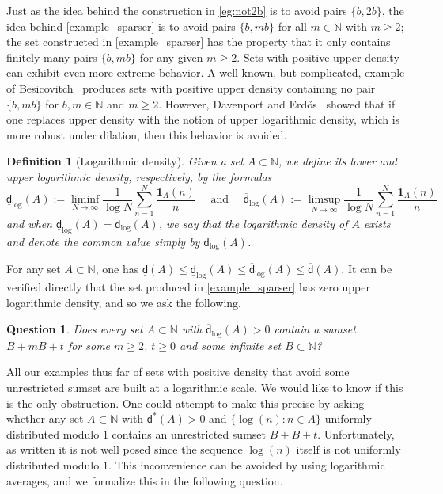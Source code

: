 \documentclass[10pt,dvipsnames]{article}
\newtheorem{definition}[theorem]{Definition}
\newtheorem{question}[theorem]{Question}
\theoremstyle{definition}
\theoremstyle{plain}
\newcommand{\N}{\mathbb{N}}
\newcommand{\dens}{\mathsf{d}}
\newcommand{\udens}{\overline{\mathsf{d}}}
\newcommand{\ldens}{\underline{\mathsf{d}}}
\newcommand{\ubdens}{\mathsf{d}^*}
\newcommand{\Erdos}{Erd\H{o}s}
\newcommand{\one}{\boldsymbol{1}}
\begin{document}
Just as the idea behind the construction in \cref{eg:not2b} is to avoid pairs $\{b,2b\}$, the idea behind \cref{example_sparser} is to avoid pairs $\{b,mb\}$ for all $m \in \N$ with $m\geq2$;
the set constructed in \cref{example_sparser} has the property that it only contains finitely many pairs $\{b,mb\}$ for any given $m\geq 2$.
Sets with positive upper density can exhibit even more extreme behavior. A well-known, but complicated, example of Besicovitch~\cite{Besicovitch35} produces sets with positive upper density containing no pair $\{b,mb\}$ for $b,m\in\N$ and $m\geq 2$. However, Davenport and \Erdos{}~\cite{Davenport-Erdos36, Davenport-Erdos51} showed that if one replaces upper density with the  notion of upper logarithmic density, which is more robust under dilation, then this behavior is avoided.


\begin{definition}[Logarithmic density]
\label{def_log_density}
Given a set $A\subset\N$,  we define its lower and upper logarithmic density, respectively, by the formulas
\[
\ldens_{\log}(A):=\liminf_{N\to\infty}\frac1{\log N}\sum_{n=1}^N\frac{\one_A(n)}n\quad\text{ and }\quad\udens_{\log}(A):=\limsup_{N\to\infty}\frac1{\log N}\sum_{n=1}^N\frac{\one_A(n)}n
\]
and when $\ldens_{\log}(A)=\udens_{\log}(A)$, we say that the logarithmic density of $A$ exists and denote the common value simply by $\dens_{\log}(A)$.
\end{definition}

For any set $A\subset\N$, one has $\ldens(A)\leq\ldens_{\log}(A) \leq \udens_{\log}(A) \leq \udens(A)$. 
It can be verified directly that the set produced in \cref{example_sparser} has zero upper logarithmic density, and so we ask the following. 

\begin{question}
\label{question_withmultiplicativehints}
Does every set $A\subset\N$ with $\udens_{\log}(A)>0$ contain a sumset $B+mB+t$ for some $m\geq2$, $t\geq0$ and some infinite set $B\subset\N$?
\end{question}




 
All our examples thus far of sets with positive density that avoid some unrestricted sumset are built at a logarithmic scale. 
We would like to know if this is the only obstruction.
One could attempt to make this precise by asking whether any set $A\subset\N$ with $\ubdens(A)>0$ and $\{\log(n):n\in A\}$ uniformly distributed modulo $1$ contains an unrestricted sumset $B+B+t$.
Unfortunately, as written it is not well posed since the sequence $\log(n)$ itself is not uniformly distributed modulo $1$.
This inconvenience can be avoided by using logarithmic averages, and we formalize this in the following question.
\end{document}

